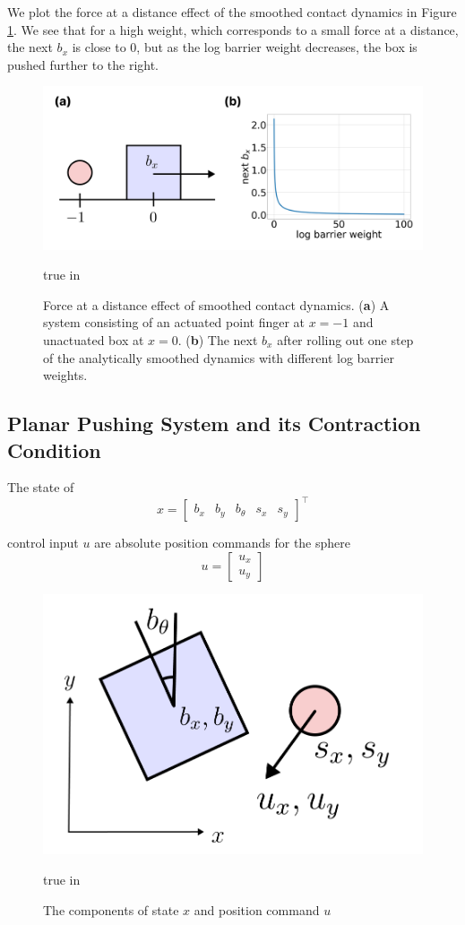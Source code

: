 \documentclass[journal]{IEEEtran}
\begin{document}
We plot the force at a distance effect of the smoothed contact dynamics in Figure \ref{fig:smoothed_contact_dynamics}. We see that for a high weight, which corresponds to a small force at a distance, the next $b_x$ is close to 0, but as the log barrier weight decreases, the box is pushed further to the right.

\begin{figure}[h]
	\centering\includegraphics[width = 0.45 \textwidth]
	{figures/smoothed_contact_dynamics.png}
    \caption{Force at a distance effect of smoothed contact dynamics. (\textbf{a}) A system consisting of an actuated point finger at $x=-1$ and unactuated box at $x=0$. (\textbf{b}) The next $b_x$ after rolling out one step of the analytically smoothed dynamics with different log barrier weights.}
	\label{fig:smoothed_contact_dynamics}
	 true in
\end{figure}

\subsection{Planar Pushing System and its Contraction Condition}
The state of 
\begin{equation}
    x = \begin{bmatrix}b_x & b_y & b_{\theta}& s_x& s_y\end{bmatrix}^\top
\end{equation}

control input $u$ are absolute position commands for the sphere
\begin{equation}
    u = \begin{bmatrix}u_x\\ u_y \end{bmatrix}
\end{equation}

\begin{figure}[h]
	\centering\includegraphics[width = 0.3 \textwidth]
	{figures/problem_setup.png}
    \caption{The components of state $x$ and position command $u$}
	\label{fig:problem_setup}
	 true in
\end{figure}
\end{document}
